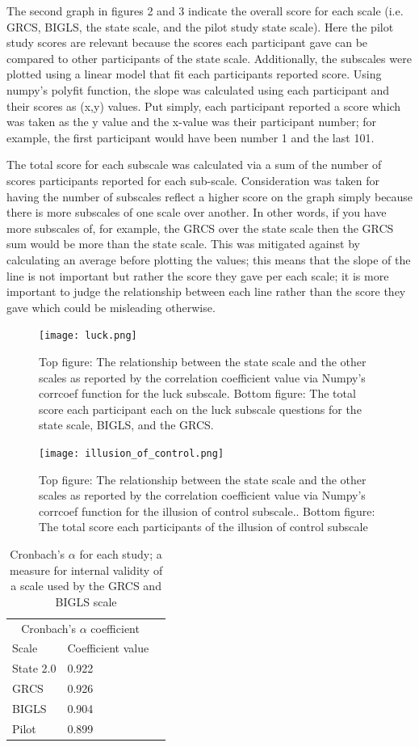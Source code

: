 \documentclass[twoside,twocolumn]{article}
\begin{document}
The second graph in figures 2 and 3 indicate the overall score for each scale (i.e. GRCS, BIGLS, the state scale, and the pilot study state scale). Here the pilot study scores are relevant because the scores each participant gave can be compared to other participants of the state scale. Additionally, the subscales were plotted using a linear model that fit each participants reported score. Using numpy's polyfit function, the slope was calculated using each participant and their scores as (x,y) values. Put simply, each participant reported a score which was taken as the y value and the x-value was their participant number; for example, the first participant would have been number 1 and the last 101. 

The total score for each subscale was calculated via a sum of the number of scores participants reported for each sub-scale. Consideration was taken for having the number of subscales reflect a higher score on the graph simply because there is more subscales of one scale over another. In other words, if you have more subscales of, for example, the GRCS over the state scale then the GRCS sum would be more than the state scale. This was mitigated against by calculating an average before plotting the values; this means that the slope of the line is not important but rather the score they gave per each scale; it is more important to judge the relationship between each line rather than the score they gave which could be misleading otherwise.

\begin{figure}
  \texttt{[image: luck.png]}
  \caption{Top figure: The relationship between the state scale and the other scales as reported by the correlation coefficient value via Numpy's corrcoef function for the luck subscale. Bottom figure: The total score each participant each on the luck subscale questions for the state scale, BIGLS, and the GRCS.}
  \centering
\end{figure}

\begin{figure}
  \texttt{[image: illusion\_of\_control.png]}
  \caption{Top figure: The relationship between the state scale and the other scales as reported by the correlation coefficient value via Numpy's corrcoef function for the illusion of control subscale.. Bottom figure: The total score each participants of the illusion of control subscale}
  \centering
\end{figure}


\begin{table}
\caption{Cronbach's $\alpha$ for each study; a measure for internal validity of a scale used by the GRCS and BIGLS scale \cite{cronbach}}
\centering
\begin{tabular}{llr}
\toprule
\multicolumn{2}{c}{Cronbach's $\alpha$ coefficient} \\
\cmidrule(r){1-2}
Scale & Coefficient value \\
\midrule
State 2.0 & 0.922 \\
GRCS & 0.926\\
BIGLS & 0.904\\
Pilot & 0.899 \\
\bottomrule
\end{tabular}
\end{table}
\end{document}
